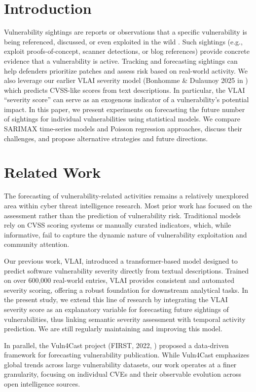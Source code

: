 \documentclass[]{article}
\begin{document}
\section{Introduction}
Vulnerability sightings are reports or observations that a specific vulnerability is being referenced, discussed, or even exploited in the wild \cite{bonhomme2025scoring}. Such sightings (e.g., exploit proofs-of-concept, scanner detections, or blog references) provide concrete evidence that a vulnerability is active. Tracking and forecasting sightings can help defenders prioritize patches and assess risk based on real-world activity. We also leverage our earlier VLAI severity model (Bonhomme \& Dulaunoy 2025 in \cite{bonhomme2025vlairobertabasedmodelautomated}) which predicts CVSS-like scores from text descriptions. In particular, the VLAI “severity score” can serve as an exogenous indicator of a vulnerability’s potential impact. In this paper, we present experiments on forecasting the future number of sightings for individual vulnerabilities using statistical models. We compare SARIMAX time-series models and Poisson regression approaches, discuss their challenges, and propose alternative strategies and future directions.


\section{Related Work}
The forecasting of vulnerability-related activities remains a relatively unexplored area within cyber threat intelligence research. Most prior work has focused on the assessment rather than the prediction of vulnerability risk. Traditional models rely on CVSS scoring systems or manually curated indicators, which, while informative, fail to capture the dynamic nature of vulnerability exploitation and community attention.

Our previous work, VLAI, introduced a transformer-based model designed to predict software vulnerability severity directly from textual descriptions. Trained on over 600,000 real-world entries, VLAI provides consistent and automated severity scoring, offering a robust foundation for downstream analytical tasks. In the present study, we extend this line of research by integrating the VLAI severity score as an explanatory variable for forecasting future sightings of vulnerabilities, thus linking semantic severity assessment with temporal activity prediction. We are still regularly maintaining and improving this model.

In parallel, the Vuln4Cast project (FIRST, 2022, \cite{10.1145/3492328}) proposed a data-driven framework for forecasting vulnerability publication. While Vuln4Cast emphasizes global trends across large vulnerability datasets, our work operates at a finer granularity, focusing on individual CVEs and their observable evolution across open intelligence sources.
\end{document}
